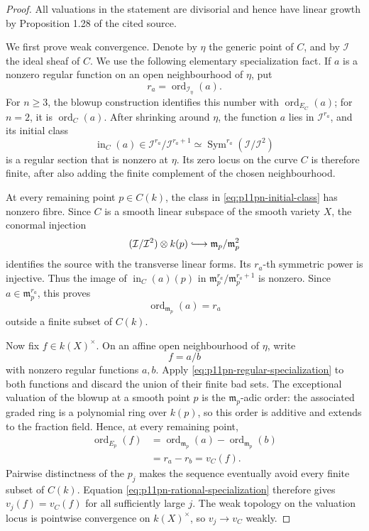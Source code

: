 \begin{proof}
All valuations in the statement are divisorial and hence have linear growth
by Proposition 1.28 of the cited source.

We first prove weak convergence.  Denote by \(\eta\) the generic point of
\(C\), and by \(\mathcal I\) the ideal sheaf of \(C\).  We use the following
elementary specialization fact.  If \(a\) is a nonzero regular function on
an open neighbourhood of \(\eta\), put
\[
 r_a=\operatorname{ord}_{\mathcal I_\eta}(a).
\]
For \(n\geq3\), the blowup construction identifies this number with
\(\operatorname{ord}_{E_C}(a)\); for \(n=2\), it is
\(\operatorname{ord}_C(a)\).  After shrinking around \(\eta\), the function
\(a\) lies in \(\mathcal I^{r_a}\), and its initial class
\[
 \operatorname{in}_C(a)
 \in \mathcal I^{r_a}/\mathcal I^{r_a+1}
 \simeq \operatorname{Sym}^{r_a}(\mathcal I/\mathcal I^2)
\tag{1}\label{eq:p11pn-initial-class}
\]
is a regular section that is nonzero at \(\eta\).  Its zero locus on the
curve \(C\) is therefore finite, after also adding the finite complement of
the chosen neighbourhood.

At every remaining point \(p\in C(k)\), the class in
\eqref{eq:p11pn-initial-class} has nonzero fibre.  Since \(C\) is a smooth
linear subspace of the smooth variety \(X\), the conormal injection
\[
 (\mathcal I/\mathcal I^2)\otimes k(p)
 \lhook\joinrel\longrightarrow
 \mathfrak m_p/\mathfrak m_p^2
\]
identifies the source with the transverse linear forms.  Its \(r_a\)-th
symmetric power is injective.  Thus the image of
\(\operatorname{in}_C(a)(p)\) in
\(\mathfrak m_p^{r_a}/\mathfrak m_p^{r_a+1}\) is nonzero.  Since
\(a\in\mathfrak m_p^{r_a}\), this proves
\[
             \operatorname{ord}_{\mathfrak m_p}(a)=r_a
\tag{2}\label{eq:p11pn-regular-specialization}
\]
outside a finite subset of \(C(k)\).

Now fix \(f\in k(X)^\times\).  On an affine open neighbourhood of \(\eta\),
write
\[
                              f=a/b
\]
with nonzero regular functions \(a,b\).  Apply
\eqref{eq:p11pn-regular-specialization} to both functions and discard the
union of their finite bad sets.  The exceptional valuation of the blowup at
a smooth point \(p\) is the \(\mathfrak m_p\)-adic order: the associated
graded ring is a polynomial ring over \(k(p)\), so this order is additive
and extends to the fraction field.  Hence, at every remaining point,
\[
 \begin{aligned}
  \operatorname{ord}_{E_p}(f)
    &=\operatorname{ord}_{\mathfrak m_p}(a)
      -\operatorname{ord}_{\mathfrak m_p}(b)\\
    &=r_a-r_b=v_C(f).
 \end{aligned}
\tag{3}\label{eq:p11pn-rational-specialization}
\]
Pairwise distinctness of the \(p_j\) makes the sequence eventually avoid
every finite subset of \(C(k)\).  Equation
\eqref{eq:p11pn-rational-specialization} therefore gives
\(v_j(f)=v_C(f)\) for all sufficiently large \(j\).  The weak topology on
the valuation locus is pointwise convergence on \(k(X)^\times\), so
\(v_j\to v_C\) weakly.


\end{proof}
